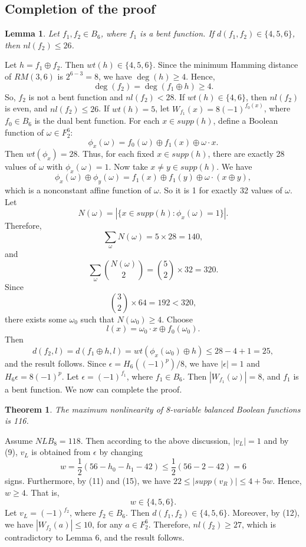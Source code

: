 \documentclass[11pt]{article}
\newtheorem{theorem}{Theorem}
\newtheorem{lemma}{Lemma}
\newtheorem{open problem}{Open problem}
\begin{document}
 \subsection{Completion of the proof}

\begin{lemma} Let $f_1,f_2\in B_6$, where $f_1$ is a bent function. If $d(f_1,f_2)\in\{4,5,6\}$, then $nl(f_2)\le26$.
\end{lemma}
\proof Let $h=f_1\oplus f_2$.  Then $wt(h)\in\{4,5,6\}$. Since the minimum Hamming distance of $RM(3,6)$ is $2^{6-3}=8$, we have $\deg(h)\ge 4$. Hence,
\[
\deg(f_2)=\deg(f_1\oplus h)\ge 4.
\]
So, $f_2$ is not a bent function and $nl(f_2)<28$. If $wt(h)\in\{4,6\}$, then $nl(f_2)$ is even, and $nl(f_2)\le 26$. If $wt(h)=5$, let $W_{f_1}(x)=8(-1)^{f_0(x)}$, where $f_0\in B_6$ is the dual bent function. For each $x\in supp(h)$, define a Boolean function of $\omega\in F_2^6$:
\[
\phi_x(\omega)=f_0(\omega)\oplus f_1(x)\oplus \omega\cdot x.
\]
Then $wt(\phi_x)=28$. Thus, for each fixed $x\in supp(h)$, there are exactly 28 values of $\omega$ with $\phi_x(\omega)=1$. Now take $x\neq y\in supp(h)$. We have
\[
\phi_x(\omega)\oplus\phi_y(\omega)=f_1(x)\oplus f_1(y)\oplus\omega\cdot (x\oplus y),
\]
which is a nonconstant affine function of $\omega$. So it is 1 for exactly 32 values of $\omega$. Let
\[
N(\omega)=|\{x\in supp(h):\phi_x(\omega)=1\}|.
\]
Therefore,
\[
\sum_{\omega}N(\omega)=5\times 28=140,
\]
and
\[
\sum_{\omega}{N(\omega)\choose 2}={5\choose 2}\times 32=320.
\]
Since
\[
{3\choose 2}\times 64=192<320,
\]
there exists some $\omega_0$ such that $N(\omega_0)\ge 4$. Choose
\[
l(x)=\omega_0\cdot x\oplus f_0(\omega_0).
\]
Then
\[
d(f_2,l)=d(f_1\oplus h,l)=wt(\phi_x(\omega_0)\oplus h)\le 28-4+1=25,
\]
and the result follows.
\endproof
Since $\epsilon=H_6((-1)^p)/8$, we have  $|\epsilon|=1$ and $H_6 \epsilon=8(-1)^p $. Let $\epsilon=(-1)^{f_1}$, where $f_1\in B_6$. Then $|W_{f_1}(\omega)|=8$, and $f_1$ is a bent function. We now can complete the proof.
\begin{theorem} The maximum nonlinearity of 8-variable balanced Boolean functions is 116.
\end{theorem}
\proof Assume $NLB_8=118$. Then according to the above discussion, $|v_L|=1$ and by (9), $v_L$ is obtained from $\epsilon$ by changing
\[
w=\frac{1}{2}(56-h_0-h_1-42)\le \frac{1}{2}(56-2-42)=6
\]
 signs. Furthermore, by (11) and (15), we have $22\le |supp(v_R)|\le 4+5w$. Hence, $w\ge 4$. That is,
\[
w\in\{4,5,6\}.
\]
Let $v_L=(-1)^{f_2}$, where $f_2\in B_6$. Then $d(f_1,f_2)\in\{4,5,6\}$. Moreover, by (12), we have $|W_{f_2}(a)|\le 10$, for any $a\in F_2^6$. Therefore, $nl(f_2)\ge 27$, which is contradictory to Lemma 6,
and the result follows.
\endproof
\end{document}
